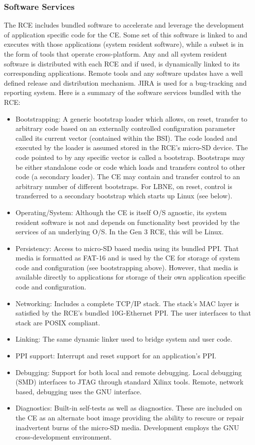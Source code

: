 \subsubsection{Software Services}
\label{sec:Services}
The RCE includes bundled software to accelerate and leverage 
the development of application specific code for the CE. 
Some set of this software is linked to and executes with those 
applications (system resident software), while a subset is in the 
form of tools that operate cross-platform. 
Any and all system resident software is distributed with each RCE 
and if used, is dynamically linked to its corresponding applications. 
Remote tools and any software updates have a well defined release and
distribution mechanism. 
JIRA is used for a bug-tracking and reporting system. 
Here is a summary of the software services bundled with the RCE:
\begin{itemize}
\item Bootstrapping: A generic bootstrap loader which allows, on reset,
transfer to arbitrary code based on an externally controlled configuration 
parameter called its current vector (contained within the BSI). 
The code loaded and executed by the loader is assumed stored in the RCE's 
micro-SD device. The code pointed to by any specific vector is called a bootstrap. 
Bootstraps may be either standalone code or
code which loads and transfers control to other code (a secondary loader). 
The CE may contain and transfer control to an arbitrary number of different 
bootstraps. 
For LBNE, on reset, control is transferred to a secondary bootstrap 
which starts up Linux (see below).
\item Operating/System: 
Although the CE is itself O/S agnostic, its system resident software is 
not and depends on functionality best provided by the services of an underlying O/S.
In the Gen 3 RCE, this will be Linux.
\item Persistency:
Access to micro-SD based media using its bundled PPI. 
That media is formatted as FAT-16 and is used by the CE 
for storage of system code and configuration (see bootstrapping above). 
However, that media is available directly to applications 
for storage of their own application specific code and configuration.
\item Networking: Includes a complete TCP/IP stack. 
The stack's MAC layer is satisfied by the RCE's bundled 10G-Ethernet PPI. 
The user interfaces to that stack are POSIX compliant.
\item Linking: The same dynamic linker used to bridge system and user code.
\item PPI support: Interrupt and reset support for an application's PPI.
\item Debugging: Support for both local and remote debugging. 
Local debugging (SMD) interfaces to JTAG through standard Xilinx tools. 
Remote, network based, debugging uses the GNU interface.
\item Diagnostics: Built-in self-tests as well as diagnostics. 
These are included on the CE as an alternate boot image providing the 
ability to rescure or repair inadvertent burns of the micro-SD media.  
Development employs the GNU cross-development environment.
\end{itemize}

